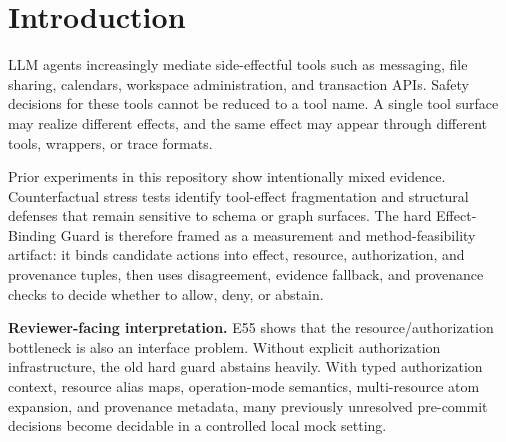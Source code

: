 \section{Introduction}
LLM agents increasingly mediate side-effectful tools such as messaging, file sharing, calendars, workspace administration, and transaction APIs. Safety decisions for these tools cannot be reduced to a tool name. A single tool surface may realize different effects, and the same effect may appear through different tools, wrappers, or trace formats.

Prior experiments in this repository show intentionally mixed evidence. Counterfactual stress tests identify tool-effect fragmentation and structural defenses that remain sensitive to schema or graph surfaces. The hard Effect-Binding Guard is therefore framed as a measurement and method-feasibility artifact: it binds candidate actions into effect, resource, authorization, and provenance tuples, then uses disagreement, evidence fallback, and provenance checks to decide whether to allow, deny, or abstain.

\textbf{Reviewer-facing interpretation.} E55 shows that the resource/authorization bottleneck is also an interface problem. Without explicit authorization infrastructure, the old hard guard abstains heavily. With typed authorization context, resource alias maps, operation-mode semantics, multi-resource atom expansion, and provenance metadata, many previously unresolved pre-commit decisions become decidable in a controlled local mock setting.
